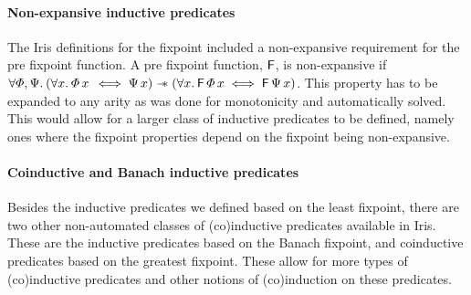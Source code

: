 \documentclass[thesis.tex]{subfiles}
\begin{document}
\paragraph{Non-expansive inductive predicates}
The Iris definitions for the fixpoint included a non-expansive requirement for the pre fixpoint function. A pre fixpoint function, $\textsf{\upshape F}$, is non-expansive if $\All \pred, \predB. (\All \var. \pred\, \var\, \iff \predB\, \var) \wand (\All \var. \hopred\, \pred\, \var \iff \hopred\, \predB\, \var)$. This property has to be expanded to any arity as was done for monotonicity and automatically solved. This would allow for a larger class of inductive predicates to be defined, namely ones where the fixpoint properties depend on the fixpoint being non-expansive.

\paragraph{Coinductive and Banach inductive predicates}
Besides the inductive predicates we defined based on the least fixpoint, there are two other non-automated classes of (co)inductive predicates available in Iris. These are the inductive predicates based on the Banach fixpoint, and coinductive predicates based on the greatest fixpoint. These allow for more types of (co)inductive predicates and other notions of (co)induction on these predicates.
\end{document}
